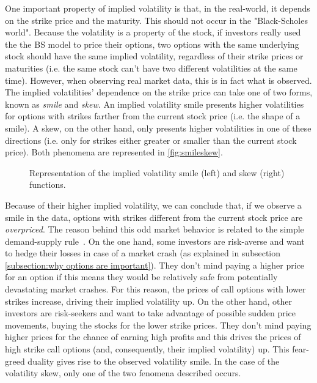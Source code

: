 One important property of implied volatility is that, in the real-world, it depends on the strike price and the maturity. This should not occur in the "Black-Scholes world". Because the volatility is a property of the stock, if investors really used the the BS model to price their options, two options with the same underlying stock should have the same implied volatility, regardless of their strike prices or maturities (i.e. the same stock can't have two different volatilities at the same time).
However, when observing real market data, this is in fact what is observed.
The implied volatilities' dependence on the strike price can take one of two forms, known as \emph{smile} and \emph{skew}.
An implied volatility smile presents higher volatilities for options with strikes farther from the current stock price (i.e. the shape of a smile). A skew, on the other hand, only presents higher volatilities in one of these directions (i.e. only for strikes either greater or smaller than the current stock price). Both phenomena are represented in \autoref{fig:smileskew}.
\begin{figure}[!htb]
  \begin{subfigmatrix}{2}
  \end{subfigmatrix}
  \caption[Representation of the implied volatility smile and skew functions.]{Representation of the implied volatility smile (left) and skew (right) functions.}
  \label{fig:smileskew}
\end{figure}


Because of their higher implied volatility, we can conclude that, if we observe a smile in the data, options with strikes different from the current stock price are \emph{overpriced}.
The reason behind this odd market behavior is related to the simple demand-supply rule~\cite{Wilmott3}. On the one hand, some investors are risk-averse and want to hedge their losses in case of a market crash (as explained in subsection \ref{subsection:why options are important}). They don't mind paying a higher price for an option if this means they would be relatively safe from potentially devastating market crashes. For this reason, the prices of call options with lower strikes increase, driving their implied volatility up. On the other hand, other investors are risk-seekers and want to take advantage of possible sudden price movements, buying the stocks for the lower strike prices. They don't mind paying higher prices for the chance of earning high profits and this drives the prices of high strike call options (and, consequently, their implied volatility) up. This fear-greed duality gives rise to the observed volatility smile. 
In the case of the volatility skew, only one of the two fenomena described occurs.


